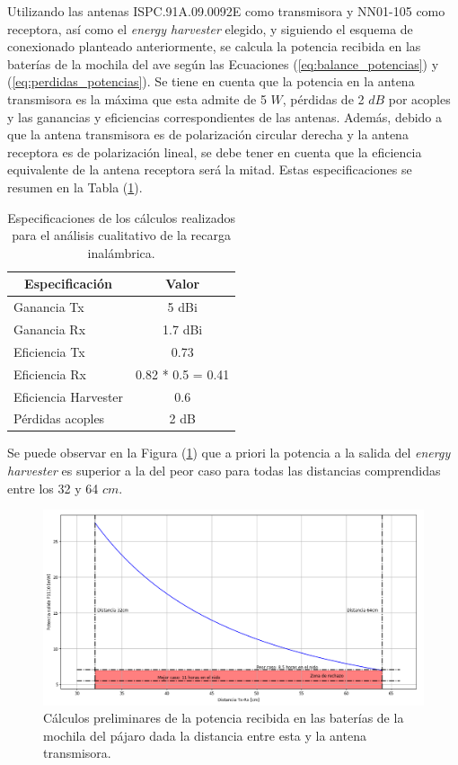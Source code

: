 Utilizando las antenas ISPC.91A.09.0092E como transmisora y NN01-105 como receptora, así como el \textit{energy harvester} elegido, y siguiendo el esquema de conexionado planteado anteriormente, se calcula la potencia recibida en las baterías de la mochila del ave según las Ecuaciones (\ref{eq:balance_potencias}) y (\ref{eq:perdidas_potencias}). Se tiene en cuenta que la potencia en la antena transmisora es la máxima que esta admite de 5 $W$, pérdidas de 2 $dB$ por acoples y las ganancias y eficiencias correspondientes de las antenas.  Además, debido a que la antena transmisora es de polarización circular derecha y la antena receptora es de polarización lineal, se debe tener en cuenta que la eficiencia equivalente de la antena receptora será la mitad. Estas especificaciones se resumen en la Tabla (\ref{tab:antenas_calc}).

\begin{table}[H]
\centering
\begin{tabular}{|l|c|}
\hline
\multicolumn{1}{|c|}{Especificación} & Valor            \\ \hline
Ganancia Tx                          & 5 dBi          \\ \hline
Ganancia Rx                          & 1.7 dBi      \\ \hline
Eficiencia Tx                        & 0.73             \\ \hline
Eficiencia Rx                        & 0.82 * 0.5 = 0.41 \\ \hline
Eficiencia Harvester                 & 0.6              \\ \hline
Pérdidas acoples                     & 2 dB           \\ \hline
\end{tabular}
\caption{Especificaciones de los cálculos realizados para el análisis cualitativo de la recarga inalámbrica.}
\label{tab:antenas_calc}
\end{table}

Se puede observar en la Figura (\ref{fig:antenas_preliminar}) que a priori la potencia a la salida del \textit{energy harvester} es superior a la del peor caso para todas las distancias comprendidas entre los 32 y 64 $cm$. 

\begin{figure}[H]
	\centering
	\includegraphics[width=\linewidth]{ImagenesFactibilidad/antenas_preliminar}
	\caption{Cálculos preliminares de la potencia recibida en las baterías de la mochila del pájaro dada la distancia entre esta y la antena transmisora.}
	\label{fig:antenas_preliminar}
\end{figure}

